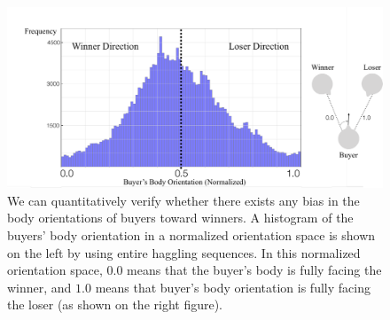 \begin{figure}[t]
	\centering       
	\includegraphics[width=\linewidth]{ssp_fig/result_buyer_bias}
	\caption{We can quantitatively verify whether there exists any bias in the body orientations of buyers toward winners. A histogram of the buyers' body orientation in a normalized orientation space is shown on the left by using entire haggling sequences. In this normalized orientation space, $0.0$ means that the buyer's body is fully facing the winner, and $1.0$ means that buyer's body orientation is fully facing the loser (as shown on the right figure).} 
	\label{fig:result_buyer_bias}
\end{figure}

\clearpage







